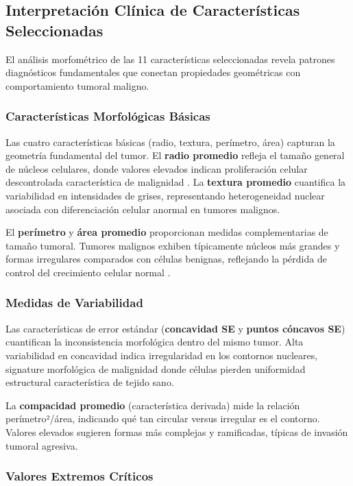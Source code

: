 \documentclass[conference]{IEEEtran}
\begin{document}
\subsection{Interpretación Clínica de Características Seleccionadas}

El análisis morfométrico de las 11 características seleccionadas revela patrones diagnósticos fundamentales que conectan propiedades geométricas con comportamiento tumoral maligno.

\subsubsection{Características Morfológicas Básicas}

Las cuatro características básicas (radio, textura, perímetro, área) capturan la geometría fundamental del tumor. El \textbf{radio promedio} refleja el tamaño general de núcleos celulares, donde valores elevados indican proliferación celular descontrolada característica de malignidad \cite{street1993}. La \textbf{textura promedio} cuantifica la variabilidad en intensidades de grises, representando heterogeneidad nuclear asociada con diferenciación celular anormal en tumores malignos.

El \textbf{perímetro} y \textbf{área promedio} proporcionan medidas complementarias de tamaño tumoral. Tumores malignos exhiben típicamente núcleos más grandes y formas irregulares comparados con células benignas, reflejando la pérdida de control del crecimiento celular normal \cite{wolberg1995}.

\subsubsection{Medidas de Variabilidad}

Las características de error estándar (\textbf{concavidad SE} y \textbf{puntos cóncavos SE}) cuantifican la inconsistencia morfológica dentro del mismo tumor. Alta variabilidad en concavidad indica irregularidad en los contornos nucleares, signature morfológica de malignidad donde células pierden uniformidad estructural característica de tejido sano.

La \textbf{compacidad promedio} (característica derivada) mide la relación perímetro²/área, indicando qué tan circular versus irregular es el contorno. Valores elevados sugieren formas más complejas y ramificadas, típicas de invasión tumoral agresiva.

\subsubsection{Valores Extremos Críticos}
\end{document}
